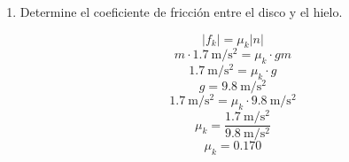 \documentclass[Física - Práctica.root.tex]{subfiles}
\newcommand{\gravity}[1][per-mode=fraction]{\SI[#1]{9,8}{\meter\per\second\squared}}
\begin{document}
\begin{enumerate}
\begin{enumerate}
          \item Determine el coeficiente de fricción entre el disco y el hielo.

                \[ |f_k| = \mu_k|n| \]
                \[ m\cdot \SI[per-mode=fraction]{1,7}{\meter\per\second\squared} = \mu_k\cdot gm \]
                \[ \SI[per-mode=fraction]{1,7}{\meter\per\second\squared} = \mu_k\cdot g \]
                \[ g = \gravity \]
                \[ \SI[per-mode=fraction]{1,7}{\meter\per\second\squared} = \mu_k\cdot\gravity \]
                \[ \mu_k = \frac{
                    \SI{1,7}{\meter\per\second\squared}
                  }{
                    \gravity[per-mode=reciprocal]
                  } \]
                \[ \boxed{\mu_k = \num{0,170}} \]

        \end{enumerate}


\end{enumerate}
\end{document}
